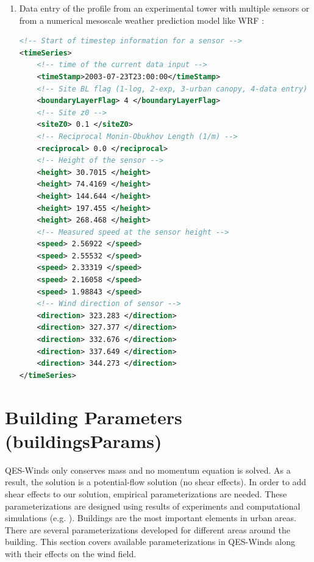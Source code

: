 \begin{enumerate}
\item Data entry of the profile from an experimental tower with multiple sensors or from a numerical mesoscale weather prediction model like WRF \cite{powers2017weather}:

\begin{lstlisting}[language=XML]
<!-- Start of timestep information for a sensor -->
<timeSeries>
	<!-- time of the current data input -->
	<timeStamp>2003-07-23T23:00:00</timeStamp>	
	<!-- Site BL flag (1-log, 2-exp, 3-urban canopy, 4-data entry) -->
	<boundaryLayerFlag> 4 </boundaryLayerFlag>
	<!-- Site z0 -->
	<siteZ0> 0.1 </siteZ0>
	<!-- Reciprocal Monin-Obukhov Length (1/m) -->
	<reciprocal> 0.0 </reciprocal>
	<!-- Height of the sensor -->
	<height> 30.7015 </height>
	<height> 74.4169 </height>
	<height> 144.644 </height>
	<height> 197.455 </height>
	<height> 268.468 </height>
	<!-- Measured speed at the sensor height -->
	<speed> 2.56922 </speed>
	<speed> 2.55532 </speed>
	<speed> 2.33319 </speed>
	<speed> 2.16058 </speed>
	<speed> 1.98843 </speed>
	<!-- Wind direction of sensor -->
	<direction> 323.283 </direction>
	<direction> 327.377 </direction>
	<direction> 332.676 </direction>
	<direction> 337.649 </direction>
	<direction> 344.273 </direction>
</timeSeries>
\end{lstlisting}

\end{enumerate}

\section{Building Parameters (buildingsParams)}

QES-Winds only conserves mass and no momentum equation is solved. As a result, the solution is a potential-flow solution (no shear effects). In order to add shear effects to our solution, empirical parameterizations are needed. These parameterizations are designed using results of experiments and computational simulations (e.g. \cite{singh2008evaluation,brown2013quic}). Buildings are the most important elements in urban areas. There are several parameterizations developed for different areas around the building. This section covers available parameterizations in QES-Winds along with their effects on the wind field.

